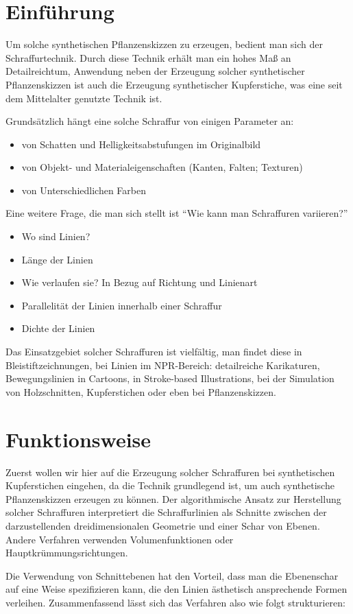\section{Einführung}
Um solche synthetischen Pflanzenskizzen zu erzeugen, bedient man sich der 
Schraffurtechnik. Durch diese Technik erhält man ein hohes Maß an 
Detailreichtum, Anwendung neben der Erzeugung solcher synthetischer 
Pflanzenskizzen ist auch die Erzeugung synthetischer Kupferstiche, was eine 
seit dem Mittelalter genutzte Technik ist.
\par Grundsätzlich hängt eine solche Schraffur von einigen Parameter an:

\begin{itemize}
  \item von Schatten und Helligkeitsabstufungen im Originalbild
  \item von Objekt- und Materialeigenschaften (Kanten, Falten; Texturen)
  \item von Unterschiedlichen Farben
\end{itemize}

Eine weitere Frage, die man sich stellt ist "`Wie kann man Schraffuren 
variieren?"'

\begin{itemize}
  \item Wo sind Linien?
  \item Länge der Linien
  \item Wie verlaufen sie? In Bezug auf Richtung und Linienart
  \item Parallelität der Linien innerhalb einer Schraffur
  \item Dichte der Linien
\end{itemize}

Das Einsatzgebiet solcher Schraffuren ist vielfältig, man findet diese in 
Bleistiftzeichnungen, bei Linien im NPR-Bereich: detailreiche Karikaturen, 
Bewegungslinien in Cartoons, in Stroke-based Illustrations, bei der Simulation 
von Holzschnitten, Kupferstichen oder eben bei Pflanzenskizzen.

\section{Funktionsweise}
Zuerst wollen wir hier auf die Erzeugung solcher Schraffuren bei synthetischen 
Kupferstichen eingehen, da die Technik grundlegend ist, um auch synthetische 
Pflanzenskizzen erzeugen zu können. Der algorithmische Ansatz zur Herstellung 
solcher Schraffuren interpretiert die Schraffurlinien als Schnitte zwischen der 
darzustellenden dreidimensionalen Geometrie und einer Schar von Ebenen. Andere 
Verfahren verwenden Volumenfunktionen oder Hauptkrümmungsrichtungen. \par Die 
Verwendung von Schnittebenen hat den Vorteil, dass man die Ebenenschar auf eine 
Weise spezifizieren kann, die den Linien ästhetisch ansprechende Formen 
verleihen.
Zusammenfassend lässt sich das Verfahren also wie folgt strukturieren:

